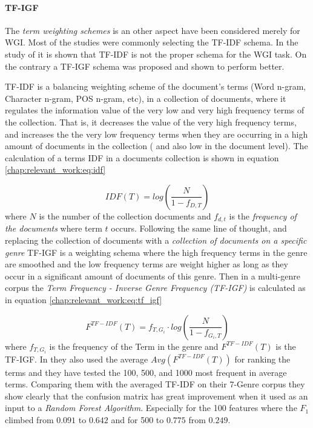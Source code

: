  \paragraph{TF-IGF}  The \textit{term weighting schemes} is an other aspect have been considered merely for WGI. Most of the studies were commonly selecting the  TF-IDF schema. In the study of \parencite{sugiyanto2014term} it is shown that TF-IDF is not the proper schema for the WGI task. On the contrary a TF-IGF schema was proposed and shown to perform better. 
 
TF-IDF is a balancing weighting scheme of the document's terms (Word n-gram, Character n-gram, POS n-gram, etc), in a collection of documents, where it regulates the information value of the very low and very high frequency terms of the collection. That is, it decreases the value of the very high frequency terms, and increases the the very low frequency terms when they are occurring in a high amount of documents in the collection ( and also  low in the document level). The calculation of a terms IDF in a documents collection is shown in equation \ref{chap:relevant_work:eq:idf}
 
 \begin{equation}\label{chap:relevant_work:eq:idf}
 	IDF(T) = log \left( \frac{N}{1 - f_{D,T}} \right)
 \end{equation}
\noindent
where $N$ is the number of the collection documents and $f_{d,t}$ is the \textit{frequency of the documents} where term $t$ occurs. Following the same line of thought, and replacing the collection of documents with a \textit{collection of documents on a specific genre} TF-IGF is a weighting schema where the high frequency terms in the genre are smoothed and the low frequency terms are weight higher as long as they occur in a significant amount of documents of this genre. Then in a multi-genre corpus the \textit{Term Frequency - Inverse Genre Frequency (TF-IGF)} is calculated as in equation \ref{chap:relevant_work:eq:tf_igf}

 \begin{equation}\label{chap:relevant_work:eq:tf_igf}
 	F^{TF-IDF}(T) = f_{T,G_{i}} \cdot log \left( \frac{N}{1 - f_{G_{i},T}} \right)
 \end{equation}
\noindent
where $f_{T,G_{i}}$ is the frequency of the Term in the genre and $F^{TF-IDF}(T)$  is the TF-IGF. In  \parencite{sugiyanto2014term} they also used the average $Avg(F^{TF-IDF}(T))$ for ranking the terms and they have tested the 100, 500, and 1000 most frequent in average terms. Comparing them with the averaged TF-IDF on their 7-Genre corpus they show clearly that the confusion matrix has great improvement when it used as an input to a \textit{Random Forest Algorithm}. Especially for the 100 features where the $F_{1}$ climbed from $0.091$ to $0.642$ and for 500 to $0.775$ from $0.249$.

